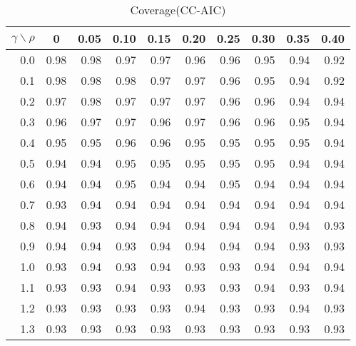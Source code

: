 \documentclass[12pt]{article}
\begin{document}
%
\begin{table}[!tbp]
\caption{Coverage(CC-AIC)}
 \begin{center}
 \begin{tabular}{r|rrrrrrrrr}\hline\hline
\multicolumn{1}{c|}{$\gamma\backslash\rho$}&\multicolumn{1}{c}{0}&\multicolumn{1}{c}{0.05}&\multicolumn{1}{c}{0.10}&\multicolumn{1}{c}{0.15}&\multicolumn{1}{c}{0.20}&\multicolumn{1}{c}{0.25}&\multicolumn{1}{c}{0.30}&\multicolumn{1}{c}{0.35}&\multicolumn{1}{c}{0.40}\tabularnewline
\hline
0.0&0.98&0.98&0.97&0.97&0.96&0.96&0.95&0.94&0.92\tabularnewline
0.1&0.98&0.98&0.98&0.97&0.97&0.96&0.95&0.94&0.92\tabularnewline
0.2&0.97&0.98&0.97&0.97&0.97&0.96&0.96&0.94&0.94\tabularnewline
0.3&0.96&0.97&0.97&0.96&0.97&0.96&0.96&0.95&0.94\tabularnewline
0.4&0.95&0.95&0.96&0.96&0.95&0.95&0.95&0.95&0.94\tabularnewline
0.5&0.94&0.94&0.95&0.95&0.95&0.95&0.95&0.94&0.94\tabularnewline
0.6&0.94&0.94&0.95&0.94&0.94&0.95&0.94&0.94&0.94\tabularnewline
0.7&0.93&0.94&0.94&0.94&0.94&0.94&0.94&0.94&0.94\tabularnewline
0.8&0.94&0.93&0.94&0.94&0.94&0.94&0.94&0.94&0.93\tabularnewline
0.9&0.94&0.94&0.93&0.94&0.94&0.94&0.94&0.93&0.93\tabularnewline
1.0&0.93&0.94&0.93&0.94&0.93&0.93&0.94&0.94&0.94\tabularnewline
1.1&0.93&0.93&0.94&0.93&0.93&0.93&0.94&0.93&0.94\tabularnewline
1.2&0.93&0.93&0.93&0.93&0.94&0.93&0.93&0.94&0.93\tabularnewline
1.3&0.93&0.93&0.93&0.93&0.93&0.93&0.93&0.93&0.93\tabularnewline
\hline
\end{tabular}

\end{center}

\end{table}
\end{document}
